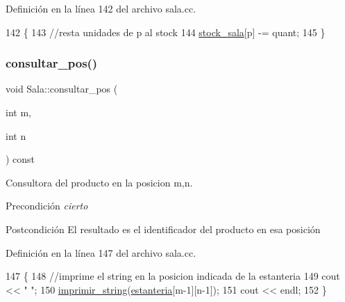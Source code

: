 Definición en la línea 142 del archivo sala.\+cc.


\begin{DoxyCode}
142                                            \{
143     \textcolor{comment}{//resta unidades de p al stock}
144     \mbox{\hyperlink{class_sala_a7c9511997ba4a6fac93625fd3f5c7703}{stock\_sala}}[p] -= quant;
145 \}
\end{DoxyCode}
\mbox{\label{class_sala_a611c18b0ebd5fd9c8ec386809b363d50}} 
\subsubsection{\texorpdfstring{consultar\+\_\+pos()}{consultar\_pos()}}
{\footnotesize\ttfamily void Sala\+::consultar\+\_\+pos (\begin{DoxyParamCaption}\item[{int}]{m,  }\item[{int}]{n }\end{DoxyParamCaption}) const}



Consultora del producto en la posicion m,n. 

\begin{DoxyPrecond}{Precondición}
{\itshape cierto} 
\end{DoxyPrecond}
\begin{DoxyPostcond}{Postcondición}
El resultado es el identificador del producto en esa posición 
\end{DoxyPostcond}


Definición en la línea 147 del archivo sala.\+cc.


\begin{DoxyCode}
147                                           \{
148     \textcolor{comment}{//imprime el string en la posicion indicada de la estanteria}
149     cout << \textcolor{stringliteral}{"  "};
150     \mbox{\hyperlink{sala_8cc_ac1916f29be6c9137b2df1079e26c54f3}{imprimir\_string}}(\mbox{\hyperlink{class_sala_a8f5264818c98db9c0d075c51a7672d95}{estanteria}}[m-1][n-1]);
151     cout << endl;
152 \}
\end{DoxyCode}
\mbox{\label{class_sala_ac1bcf6e4f9a336b505a362468411af20}} 
